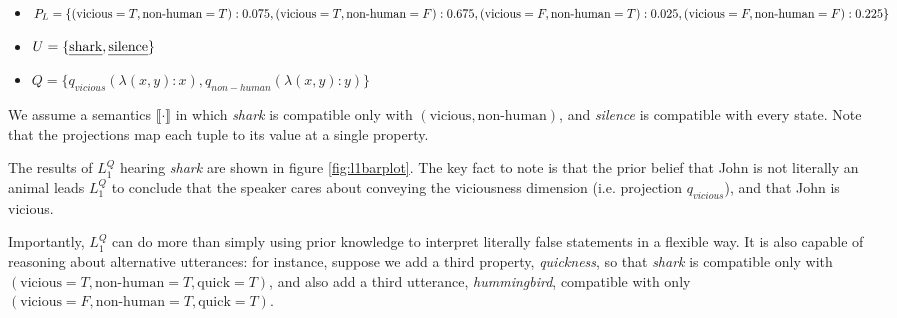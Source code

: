 \documentclass[OpenMind]{stjour}
\newcommand{\Listener}{L}
\newcommand{\QLONE}{\Listener_{{1}}^{{Q}}}
\begin{document}
	\begin{itemize}
	\item $P_L = \{(\textrm{vicious}=T,\textrm{non-human}=T) : 0.075, \\(\textrm{vicious}=T,\textrm{non-human}=F) : 0.675,\\ (\textrm{vicious}=F,\textrm{non-human}=T) : 0.025, \\(\textrm{vicious}=F,\textrm{non-human}=F): 0.225\}$
	\item $U = \{\textrm{\emph{shark}}, \textrm{\emph{silence}}\}$
	\item $Q = \{q_{vicious} (\lambda (x,y):x), q_{non-human} (\lambda (x,y):y) \}$ 
	\end{itemize}

	We assume a semantics $\llbracket\cdot\rrbracket$ in which \emph{shark} is compatible only with $(\textrm{vicious}, \textrm{non-human})$, and \emph{silence} is compatible with every state. Note that the projections map each tuple to its value at a single property. 
	
	The results of $\QLONE$ hearing \emph{shark} are shown in figure \ref{fig:l1barplot}.
	The key fact to note is that the prior belief that John is not literally an animal leads $\QLONE$ to conclude that the speaker cares about conveying the viciousness dimension (i.e. projection $q_{vicious}$), and that John is vicious.

	Importantly, $\QLONE$ can do more than simply using prior knowledge to interpret literally false statements in a flexible way. It is also capable of reasoning about alternative utterances: for instance, suppose we add a third property, \emph{quickness}, so that \emph{shark} is compatible only with $(\textrm{vicious}=T,\textrm{non-human}=T, \textrm{quick}=T)$, and also add a third utterance, \emph{hummingbird}, compatible with only $(\textrm{vicious}=F,\textrm{non-human}=T, \textrm{quick}=T)$.
	
\end{document}
